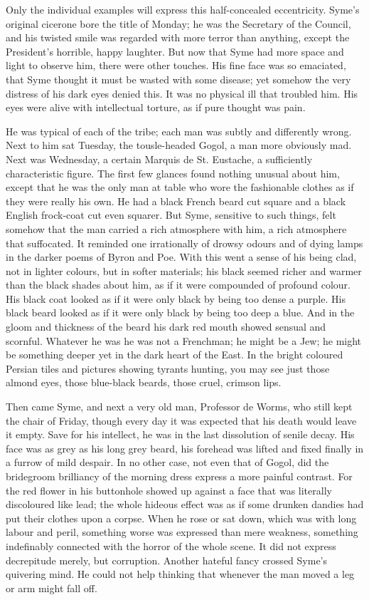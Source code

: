 Only the individual examples will express this half-concealed eccentricity. Syme’s original cicerone bore the title of Monday; he was the Secretary of the Council, and his twisted smile was regarded with more terror than anything, except the President’s horrible, happy laughter. But now that Syme had more space and light to observe him, there were other touches. His fine face was so emaciated, that Syme thought it must be wasted with some disease; yet somehow the very distress of his dark eyes denied this. It was no physical ill that troubled him. His eyes were alive with intellectual torture, as if pure thought was pain.

He was typical of each of the tribe; each man was subtly and differently wrong. Next to him sat Tuesday, the tousle-headed Gogol, a man more obviously mad. Next was Wednesday, a certain Marquis de St. Eustache, a sufficiently characteristic figure. The first few glances found nothing unusual about him, except that he was the only man at table who wore the fashionable clothes as if they were really his own. He had a black French beard cut square and a black English frock-coat cut even squarer. But Syme, sensitive to such things, felt somehow that the man carried a rich atmosphere with him, a rich atmosphere that suffocated. It reminded one irrationally of drowsy odours and of dying lamps in the darker poems of Byron and Poe. With this went a sense of his being clad, not in lighter colours, but in softer materials; his black seemed richer and warmer than the black shades about him, as if it were compounded of profound colour. His black coat looked as if it were only black by being too dense a purple. His black beard looked as if it were only black by being too deep a blue. And in the gloom and thickness of the beard his dark red mouth showed sensual and scornful. Whatever he was he was not a Frenchman; he might be a Jew; he might be something deeper yet in the dark heart of the East. In the bright coloured Persian tiles and pictures showing tyrants hunting, you may see just those almond eyes, those blue-black beards, those cruel, crimson lips.

Then came Syme, and next a very old man, Professor de Worms, who still kept the chair of Friday, though every day it was expected that his death would leave it empty. Save for his intellect, he was in the last dissolution of senile decay. His face was as grey as his long grey beard, his forehead was lifted and fixed finally in a furrow of mild despair. In no other case, not even that of Gogol, did the bridegroom brilliancy of the morning dress express a more painful contrast. For the red flower in his buttonhole showed up against a face that was literally discoloured like lead; the whole hideous effect was as if some drunken dandies had put their clothes upon a corpse. When he rose or sat down, which was with long labour and peril, something worse was expressed than mere weakness, something indefinably connected with the horror of the whole scene. It did not express decrepitude merely, but corruption. Another hateful fancy crossed Syme’s quivering mind. He could not help thinking that whenever the man moved a leg or arm might fall off.

